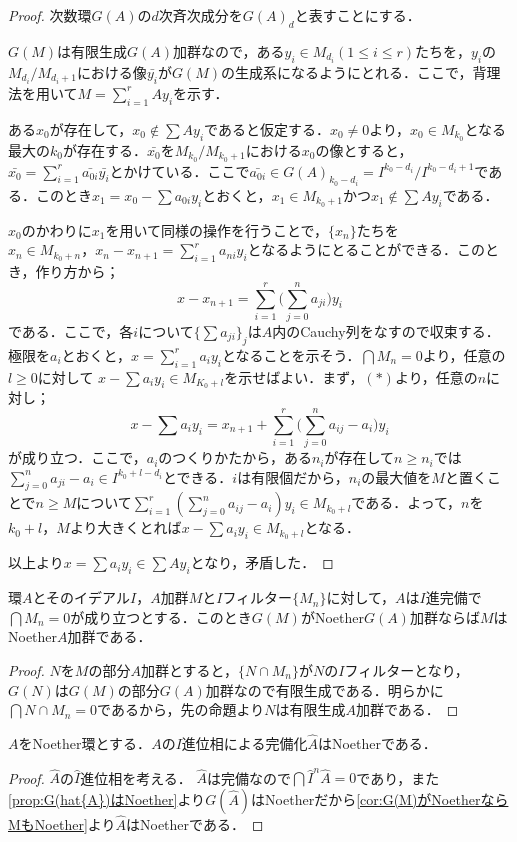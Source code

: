 \begin{proof}
	次数環$G(A)$の$d$次斉次成分を$G(A)_d$と表すことにする．
	
	$G(M)$は有限生成$G(A)$加群なので，ある$y_i\in M_{d_i} (1\leq i\leq r)$たちを，$y_i$の$M_{d_i}/M_{d_i+1}$における像$\bar{y_i}$が$G(M)$の生成系になるようにとれる．ここで，背理法を用いて$M=\sum_{i=1}^r Ay_i$を示す．
	
	ある$x_0$が存在して，$x_0\not\in\sum Ay_i$であると仮定する．$x_0\neq0$より，$x_0\in M_{k_0}$となる最大の$k_0$が存在する．$\bar{x_0}$を$M_{k_0}/M_{k_0+1}$における$x_0$の像とすると，$\bar{x_0}=\sum_{i=1}^r\bar{a_{0i}}\bar{y_i}$とかけている．ここで$\bar{a_{0i}}\in G(A)_{k_0-d_i}=I^{k_0-d_i}/I^{k_0-d_i+1}$である．このとき$x_1=x_0-\sum a_{0i}y_i$とおくと，$x_1\in M_{k_0+1}$かつ$x_1\not\in\sum Ay_i$である．
	
	$x_0$のかわりに$x_1$を用いて同様の操作を行うことで，$\{x_n\}$たちを$x_n\in M_{k_0+n}，x_n-x_{n+1}=\sum_{i=1}^r a_{ni}y_i$となるようにとることができる．このとき，作り方から；
	\[x-x_{n+1}=\sum_{i=1}^r\biggl(\sum_{j=0}^n a_{ji}\biggr) y_i\tag{$\ast$}\]
	である．ここで，各$i$について$\{\sum a_{ji}\}_j$は$A$内のCauchy列をなすので収束する．極限を$a_i$とおくと，$x=\sum_{i=1}^r a_iy_i$となることを示そう．$\bigcap M_n=0$より，任意の$l\geq0$に対して $x-\sum a_iy_i\in M_{K_0+l}$を示せばよい．まず，$(\ast)$より，任意の$n$に対し；
	\[x-\sum a_iy_i=x_{n+1}+\sum_{i=1}^r\biggl(\sum_{j=0}^{n} a_{ij}-a_i\biggr)y_i\]
	が成り立つ．ここで，$a_i$のつくりかたから，ある$n_i$が存在して$n\geq n_i$では$\sum_{j=0}^n a_{ji}-a_i\in I^{k_0+l-d_i}$とできる．$i$は有限個だから，$n_i$の最大値を$M$と置くことで$n\geq M$について$\sum_{i=1}^r(\sum_{j=0}^n a_{ij}-a_i)y_i\in M_{k_0+l}$である．よって，$n$を$k_0+l，M$より大きくとれば$x-\sum a_iy_i\in M_{k_0+l}$となる．
	
	以上より$x=\sum a_iy_i\in\sum Ay_i$となり，矛盾した．
\end{proof}

\begin{cor}\label{cor:G(M)がNoetherならMもNoether}
	環$A$とそのイデアル$I$，$A$加群$M$と$I$フィルター$\{M_n\}$に対して，$A$は$I$進完備で$\bigcap M_n=0$が成り立つとする．このとき$G(M)$がNoether$G(A)$加群ならば$M$はNoether$A$加群である．
\end{cor}

\begin{proof}
	$N$を$M$の部分$A$加群とすると，$\{N\cap M_n\}$が$N$の$I$フィルターとなり，$G(N)$は$G(M)$の部分$G(A)$加群なので有限生成である．明らかに$\bigcap N\cap M_n=0$であるから，先の命題より$N$は有限生成$A$加群である．
\end{proof}

\begin{thm}
	$A$をNoether環とする．$A$の$I$進位相による完備化$\widehat{A}$はNoetherである．
\end{thm}

\begin{proof}
	$\widehat{A}$の$\widehat{I}$進位相を考える．	$\widehat{A}$は完備なので$\bigcap \widehat{I}^n\widehat{A}=0$であり，また\ref{prop:G(hat{A})はNoether}より$G(\widehat{A})$はNoetherだから\ref{cor:G(M)がNoetherならMもNoether}より$\widehat{A}$はNoetherである．
\end{proof}
